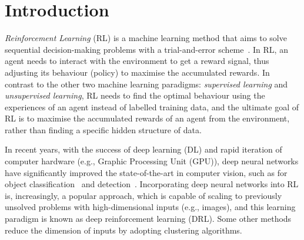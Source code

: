 \chapter{Introduction}
\label{chapter1}
\textit{Reinforcement Learning} (RL) is a machine learning method that aims to solve sequential decision-making problems with a trial-and-error scheme~\cite{sutton2018reinforcement}. In RL, an agent needs to interact with the environment to get a reward signal, thus adjusting its behaviour (policy) to maximise the accumulated rewards. In contrast to the other two machine learning paradigms: \textit{supervised learning} and \textit{unsupervised learning}, RL needs to find the optimal behaviour using the experiences of an agent instead of labelled training data, and the ultimate goal of RL is to maximise the accumulated rewards of an agent from the environment, rather than finding a specific hidden structure of data.

In recent years, with the success of deep learning (DL) and rapid iteration of computer hardware (e.g., Graphic Processing Unit (GPU)), deep neural networks have significantly improved the state-of-the-art in computer vision, such as for object classification~\cite{krizhevsky2012imagenet} and detection~\cite{ren2015faster}. Incorporating deep neural networks into RL is, increasingly, a popular approach, which is capable of scaling to previously unsolved problems with high-dimensional inputs (e.g., images), and this learning paradigm is known as deep reinforcement learning (DRL). Some other methods~\cite{guo2016k} reduce the dimension of inputs by adopting clustering algorithms.

